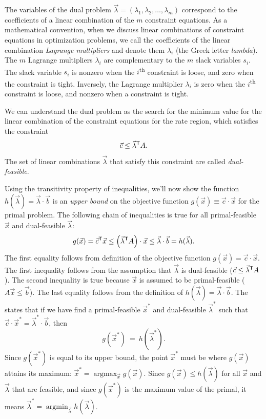 \documentclass[11pt,oneside]{article}
\begin{document}
			
			The variables of the dual problem $\vec{\lambda}=(\lambda_1, \lambda_2, \ldots, \lambda_m)$ 
			correspond to the coefficients of a linear combination of the $m$ constraint equations.
			As a mathematical convention, 
			when we discuss linear combinations of constraint equations in optimization problems,
			we call the coefficients of the linear combination \emph{Lagrange multipliers} and denote them $\lambda_i$ (the Greek letter \emph{lambda}).
			The $m$ Lagrange multipliers $\lambda_i$ are complementary to the $m$ slack variables $s_i$.
			The slack variable $s_i$ is nonzero when the $i$\textsuperscript{th} constraint is loose,
			and zero when the constraint is tight.
			Inversely, the Lagrange multiplier $\lambda_i$ is zero when the $i$\textsuperscript{th} constraint is loose,
			and nonzero when a constraint is tight.


			We can understand the dual problem as the search for the minimum value 
			for the linear combination of the constraint equations for the rate region,
			which satisfies the constraint 
			\[	
				\vec{c} \leq \vec{\lambda}^{\mathsf{T}} A.
			\]
			The set of linear combinations $\vec{\lambda}$ that satisfy this constraint are called \emph{dual-feasible}.
			
			Using the transitivity property of inequalities,
			we'll now show the function $h(\vec{\lambda}) = \vec{\lambda} \cdot \vec{b}$
			is an \emph{upper bound} on the objective function $g(\vec{x}) \equiv \vec{c} \cdot \vec{x}$ for the primal problem.
			The following chain of inequalities is true for all primal-feasible $\vec{x}$ and dual-feasible $\vec{\lambda}$:
			\[
				g(\vec{x}) 
					= 	\vec{c}^{\mathsf{T}} \vec{x} 
					\leq 	\left(\vec{\lambda}^{\mathsf{T}} A\right) \cdot \vec{x} 
					\leq 	\vec{\lambda} \cdot \vec{b}  
					= 	h(\vec{\lambda}).
			\]
			The first equality follows from definition of the objective function $g(\vec{x}) = \vec{c} \cdot \vec{x}$.
			The first inequality follows from the assumption that $\vec{\lambda}$ is dual-feasible ($\vec{c} \leq \vec{\lambda}^{\mathsf{T}} A$).
			The second inequality is true because $\vec{x}$ is assumed to be primal-feasible ($A\vec{x}\leq\vec{b}$).
			The last equality follows from the definition of $h(\vec{\lambda}) = \vec{\lambda} \cdot \vec{b}$.
			The  states that if we have find 
			a primal-feasible $\vec{x}^*$ and dual-feasible $\vec{\lambda}^*$ such that 
			 $\vec{c} \cdot \vec{x}^* = \vec{\lambda}^* \cdot \vec{b}$,
			 then 
			 \[
			 	g(\vec{x}^*) \ = \ h(\vec{\lambda}^*).
			 \]
			 Since $g(\vec{x}^*)$ is equal to its upper bound,
			 the point $\vec{x}^*$ must be where $g(\vec{x})$ attains its maximum: 
			 $\displaystyle \vec{x}^* = \mathop{\textrm{argmax}}_{\vec{x}} g(\vec{x})$.
			 Since $g(\vec{x}) \leq h(\vec{\lambda})$ for all $\vec{x}$ and $\vec{\lambda}$ that are feasible,
			 and since $g(\vec{x}^*)$ is the maximum value of the primal,
			 it means $\displaystyle \vec{\lambda}^* = \mathop{\textrm{argmin}}_{\vec{\lambda}} h(\vec{\lambda})$.
			
\end{document}
